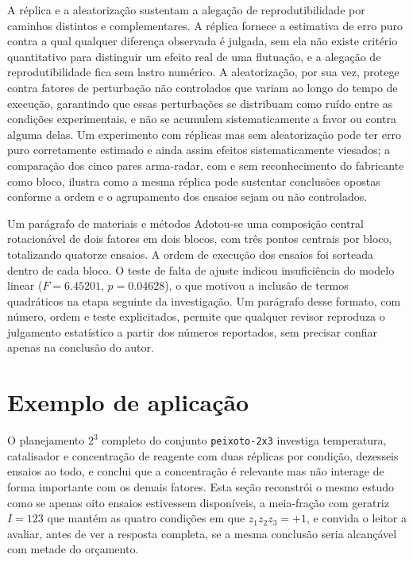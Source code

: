 \documentclass{doeapostila}
\begin{document}
A réplica e a aleatorização sustentam a alegação de reprodutibilidade por
caminhos distintos e complementares. A réplica fornece a estimativa de erro
puro contra a qual qualquer diferença observada é julgada, sem ela não existe
critério quantitativo para distinguir um efeito real de uma flutuação, e a
alegação de reprodutibilidade fica sem lastro numérico. A aleatorização, por
sua vez, protege contra fatores de perturbação não controlados que variam ao
longo do tempo de execução, garantindo que essas perturbações se distribuam
como ruído entre as condições experimentais, e não se acumulem
sistematicamente a favor ou contra alguma delas. Um experimento com réplicas
mas sem aleatorização pode ter erro puro corretamente estimado e ainda assim
efeitos sistematicamente viesados; a comparação dos cinco pares arma-radar,
com e sem reconhecimento do fabricante como bloco, ilustra como a mesma
réplica pode sustentar conclusões opostas conforme a ordem e o agrupamento
dos ensaios sejam ou não controlados.

\begin{aplicacao}{Um parágrafo de materiais e métodos}
  Adotou-se uma composição central rotacionável de dois fatores em dois
  blocos, com três pontos centrais por bloco, totalizando quatorze ensaios.
  A ordem de execução dos ensaios foi sorteada dentro de cada bloco. O teste
  de falta de ajuste indicou insuficiência do modelo linear
  ($F = \num{6.45201}$, $p = \num{0.04628}$), o que motivou a inclusão de
  termos quadráticos na etapa seguinte da investigação. Um parágrafo desse
  formato, com número, ordem e teste explicitados, permite que qualquer
  revisor reproduza o julgamento estatístico a partir dos números
  reportados, sem precisar confiar apenas na conclusão do autor.
\end{aplicacao}

\section{Exemplo de aplicação}
\label{sec:exemplo-final}

O planejamento $2^{3}$ completo do conjunto \texttt{peixoto-2x3} investiga
temperatura, catalisador e concentração de reagente com duas réplicas por
condição, dezesseis ensaios ao todo, e conclui que a concentração é
relevante mas não interage de forma importante com os demais fatores. Esta
seção reconstrói o mesmo estudo como se apenas oito ensaios estivessem
disponíveis, a meia-fração com geratriz $I = 123$ que mantém as quatro
condições em que $z_{1}z_{2}z_{3} = +1$, e convida o leitor a avaliar, antes
de ver a resposta completa, se a mesma conclusão seria alcançável com metade
do orçamento.
\end{document}
